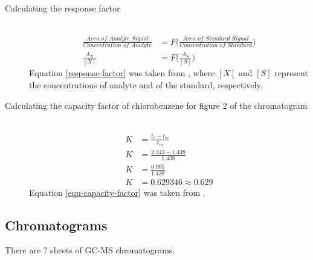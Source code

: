 \documentclass[a4paper, 12pt]{article}
\begin{document}
\begin{description}

	\item[Calculating the response factor] \hfill \\
		\begin{equation} \label{response-factor}
			\begin{split}
				\frac{\textit{Area of Analyte Signal}}{\textit{Concentration of Analyte}} & = F\Bigg(\frac{\textit{Area of Standard Signal}}{\textit{Concentration of Standard}}\Bigg) \\
				\frac{A_X}{[X]} & = F\Bigg(\frac{A_S}{[S]}\Bigg)
			\end{split}
		\end{equation}
		Equation \ref{response-factor} was taken from \cite{harris}, where $[X]$ and $[S]$ represent the concentrations of analyte and of the standard, respectively.

	\item[Calculating the capacity factor of chlorobenzene for figure 2 of the chromatogram] \hfill \\
		\begin{equation} \label{equ-capacity-factor}
			\begin{split}
				K & = \frac{t_r - t_m}{t_m} \\
				K & = \frac{2.343 - 1.438}{1.438} \\
				K & = \frac{0.905}{1.438} \\
				K & = 0.629346 \approx 0.629
			\end{split}
		\end{equation}
		Equation \ref{equ-capacity-factor} was taken from \cite{harris}.

\end{description}


\subsection{Chromatograms}
There are ? sheets of GC-MS chromatograms.

\end{document}
